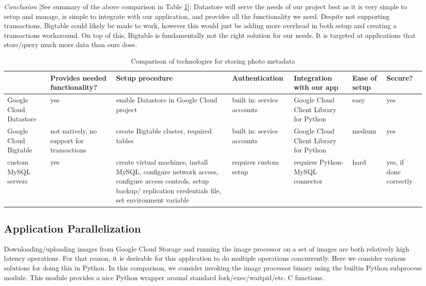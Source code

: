\documentclass[10pt, onecolumn, draftclsnofoot, letterpaper, compsoc]{IEEEtran}
\begin{document}
\textit{Conclusion} [See summary of the above comparison in Table \ref{table:bret2}]:
Datastore will serve the needs of our project best as it is 
very simple to setup and manage, is simple to integrate with our application, 
and provides all the functionality we need. Despite not supporting transactions, 
Bigtable could likely be made to work, however this would just be adding more 
overhead in both setup and creating a transactions workaround. On top of this, 
Bigtable is fundamentally not the right solution for our needs. It is 
targeted at applications that store/query much more data than ours does.

\begin{table}[h]
\centering
\caption{Comparison of technologies for storing photo metadata}
\begin{tabular}{|p{1.8cm}|p{1.4cm}|p{3cm}|p{1.8cm}|p{1.8cm}|p{1.8cm}|p{1cm}|}
\cline{4-4}
\hline

 & Provides needed functionality? & Setup procedure & Authentication 
 & Integration with our app & Ease of setup & Secure? \\ \hline

Google Cloud Datastore & yes & enable Datastore in Google Cloud project
& built in: service accounts & Google Cloud Client Library for Python
& easy & yes \\ \hline

Google Cloud Bigtable & not natively, no support for transactions &
create Bigtable cluster, required tables & built in: service accounts 
& Google Cloud Client Library for Python & medium & yes \\ \hline

custom MySQL servers & yes & create virtual machines, install MySQL, 
configure network access, configure access controls, setup backup/
replication credentials file, set environment variable & requires custom setup 
& requires Python-MySQL connector & hard & yes, if done correctly \\ \hline

\end{tabular}
\label{table:bret2}
\end{table}

\subsection{Application Parallelization}

Downloading/uploading images from Google Cloud Storage and running the 
image processor on a set of images are both relatively high latency operations. 
For that reason, it is desirable for this application to do multiple operations 
concurrently. Here we consider various solutions for doing this in Python. In 
this comparison, we consider invoking the image processor binary using the 
builtin Python subprocess module. This module provides a nice Python wrapper 
around standard fork/exec/waitpid/etc. C functions.
\end{document}
